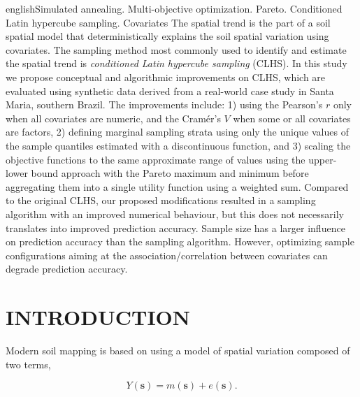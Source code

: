 \def\enkeys{Simulated annealing. Multi-objective optimization. Pareto. Conditioned Latin hypercube sampling. 
Covariates}
  
\begin{chapterabstract}{english}{\enkeys}
The spatial trend is the part of a soil spatial model that deterministically explains the soil spatial 
variation using covariates. The sampling method most commonly used to identify and estimate the spatial trend 
is \emph{conditioned Latin hypercube sampling} (CLHS). In this study we propose conceptual and algorithmic 
improvements on CLHS, which are evaluated using synthetic data derived from a real-world  case study in Santa 
Maria, southern Brazil. The improvements include: 1) using the Pearson's $r$ only when all covariates are 
numeric, and the Cramér's $V$ when some or all covariates are factors, 2) defining marginal sampling 
strata using only the unique values of the sample quantiles estimated with a discontinuous function, and 3) 
scaling the objective functions to the same approximate range of values using the upper-lower bound approach 
with the Pareto maximum and minimum before aggregating them into a single utility function using a weighted 
sum. Compared to the original CLHS, our proposed modifications resulted in a sampling algorithm with an 
improved numerical behaviour, but this does not necessarily translates into improved prediction accuracy. 
Sample size has a larger influence on prediction accuracy than the sampling algorithm. However, 
optimizing sample configurations aiming at the association/correlation between covariates can degrade 
prediction accuracy.
\end{chapterabstract}

\formatchapter

\section{INTRODUCTION}
\label{sec:chap08-intro}

Modern soil mapping is based on using a model of spatial variation composed of two terms, 

\begin{equation}\label{eqn:chap08-lmm}
 Y(\boldsymbol{s}) = m(\boldsymbol{s}) + e(\boldsymbol{s}).
\end{equation}

\def\footgerard{\footnote{Gerard Heuvelink shared the same opinion during his Richard Webster Medal speech at 
the conference of the Pedometrics Commission of the IUSS, which took place from 14--18 September 2015, in 
Córdoba, Spain.}}

